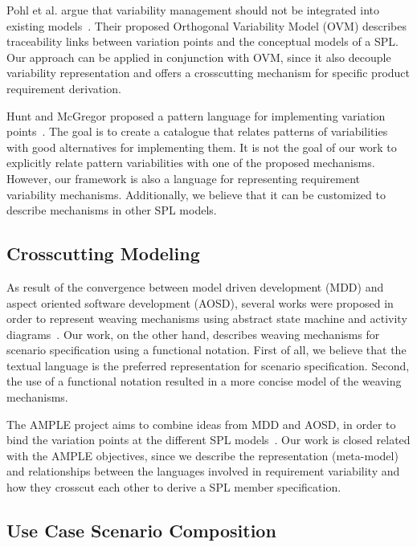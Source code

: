 \documentclass{acm_proc_article-sp}
\begin{document}
Pohl et al. argue that variability management should not be
integrated into existing models~\cite{phol-spl-book}. Their proposed
Orthogonal Variability Model (OVM) describes traceability links
between variation points and the conceptual models of a SPL. Our
approach can be applied in conjunction with OVM, since it also
decouple variability representation and offers a crosscutting
mechanism for specific product requirement derivation.

Hunt and McGregor proposed a pattern language for implementing
variation points~\cite{hunt-splc-2006}. The goal is to create a
catalogue that relates patterns of variabilities with good
alternatives for implementing them. It is not the goal of our work
to explicitly relate pattern variabilities with one of the proposed
mechanisms. However, our framework is also a language for
representing requirement variability mechanisms. Additionally, we
believe that it can be customized to describe mechanisms in other
SPL models.

\subsection{Crosscutting Modeling}

As result of the convergence between model driven development (MDD)
and aspect oriented software development (AOSD), several works were
proposed in order to represent weaving mechanisms using abstract
state machine and activity
diagrams~\cite{noda-aom-2006,thomas-aom-2006}. Our work, on the
other hand, describes weaving mechanisms for scenario specification
using a functional notation. First of all, we believe that the
textual language is the preferred representation for scenario
specification. Second, the use of a functional notation resulted in
a more concise model of the weaving mechanisms.

The AMPLE project aims to combine ideas from MDD and AOSD, in order
to bind the variation points at the different SPL
models~\cite{ample-url}. Our work is closed related with the AMPLE
objectives, since we describe the representation (meta-model) and
relationships between the languages involved in requirement
variability and how they crosscut each other to derive a SPL member
specification.

\subsection{Use Case Scenario Composition}
\end{document}
